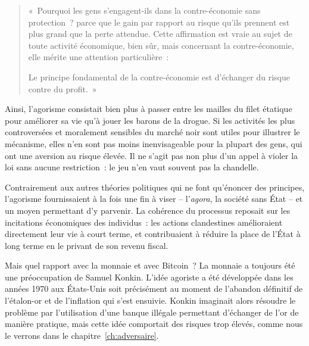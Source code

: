 \begin{quote}
«~Pourquoi les gens s'engagent-ils dans la contre-économie sans protection~? parce que le gain par rapport au risque qu'ils prennent est plus grand que la perte attendue. Cette affirmation est vraie au sujet de toute activité économique, bien sûr, mais concernant la contre-économie, elle mérite une attention particulière~:

Le principe fondamental de la contre-économie est d'échanger du risque contre du profit.~»
\end{quote} %

Ainsi, l'agorisme consistait bien plus à passer entre les mailles du filet étatique pour améliorer sa vie qu'à jouer les barons de la drogue. Si les activités les plus controversées et moralement sensibles du marché noir sont utiles pour illustrer le mécanisme, elles n'en sont pas moins inenvisageable pour la plupart des gens, qui ont une aversion au risque élevée. Il ne s'agit pas non plus d'un appel à violer la loi sans aucune restriction~: le jeu n'en vaut souvent pas la chandelle.

Contrairement aux autres théories politiques qui ne font qu'énoncer des principes, l'agorisme fournissaient à la fois une fin à viser -- l'\emph{agora}, la société sans État -- et un moyen permettant d'y parvenir. La cohérence du processus reposait sur les incitations économiques des individus~: les actions clandestines amélioraient directement leur vie à court terme, et contribuaient à réduire la place de l'État à long terme en le privant de son revenu fiscal.


Mais quel rapport avec la monnaie et avec Bitcoin~? La monnaie a toujours été une préoccupation de Samuel Konkin. L'idée agoriste a été développée dans les années 1970 aux États-Unis soit précisément au moment de l'abandon définitif de l'étalon-or et de l'inflation qui s'est ensuivie. Konkin imaginait alors résoudre le problème par l'utilisation d'une banque illégale permettant d'échanger de l'or de manière pratique, mais cette idée comportait des risques trop élevés, comme nous le verrons dans le chapitre~\ref{ch:adversaire}.

